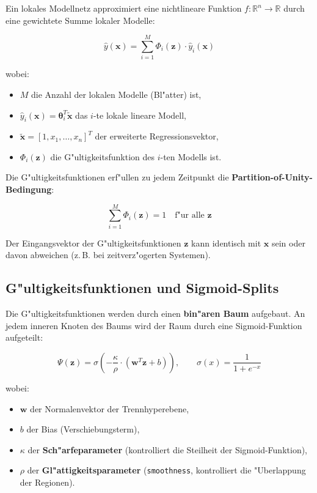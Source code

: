 \documentclass[12pt,a4paper]{article}
\begin{document}
Ein lokales Modellnetz approximiert eine nichtlineare Funktion $f: \mathbb{R}^n \rightarrow \mathbb{R}$ durch eine gewichtete Summe lokaler Modelle:

\begin{equation}
  \hat{y}(\mathbf{x}) = \sum_{i=1}^{M} \Phi_i(\mathbf{z}) \cdot \hat{y}_i(\mathbf{x})
\end{equation}

wobei:
\begin{itemize}
  \item $M$ die Anzahl der lokalen Modelle (Bl"atter) ist,
  \item $\hat{y}_i(\mathbf{x}) = \boldsymbol{\theta}_i^T \tilde{\mathbf{x}}$ das $i$-te lokale lineare Modell,
  \item $\tilde{\mathbf{x}} = [1, x_1, \ldots, x_n]^T$ der erweiterte Regressionsvektor,
  \item $\Phi_i(\mathbf{z})$ die G"ultigkeitsfunktion des $i$-ten Modells ist.
\end{itemize}

Die G"ultigkeitsfunktionen erf"ullen zu jedem Zeitpunkt die \textbf{Partition-of-Unity-Bedingung}:

\begin{equation}
  \sum_{i=1}^{M} \Phi_i(\mathbf{z}) = 1 \quad \text{f"ur alle } \mathbf{z}
\end{equation}

Der Eingangsvektor der G"ultigkeitsfunktionen $\mathbf{z}$ kann identisch mit $\mathbf{x}$ sein oder davon abweichen (z.\,B. bei zeitverz"ogerten Systemen).

\subsection{G"ultigkeitsfunktionen und Sigmoid-Splits}

Die G"ultigkeitsfunktionen werden durch einen \textbf{bin"aren Baum} aufgebaut. An jedem inneren Knoten des Baums wird der Raum durch eine Sigmoid-Funktion aufgeteilt:

\begin{equation}
  \Psi(\mathbf{z}) = \sigma\left(-\frac{\kappa}{\rho} \cdot (\mathbf{w}^T \mathbf{z} + b)\right),
  \qquad \sigma(x) = \frac{1}{1+e^{-x}}
\end{equation}

wobei:
\begin{itemize}
  \item $\mathbf{w}$ der Normalenvektor der Trennhyperebene,
  \item $b$ der Bias (Verschiebungsterm),
  \item $\kappa$ der \textbf{Sch"arfeparameter} (kontrolliert die Steilheit der Sigmoid-Funktion),
  \item $\rho$ der \textbf{Gl"attigkeitsparameter} (\texttt{smoothness}, kontrolliert die "Uberlappung der Regionen).
\end{itemize}
\end{document}
